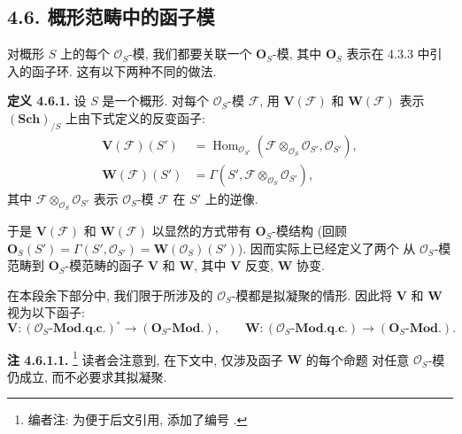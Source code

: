 \subsection*{4.6. 概形范畴中的函子模}

对概形 \(S\) 上的每个 \(\mathcal O_S\)-模, 我们都要关联一个
\(\mathbf O_S\)-模, 其中 \(\mathbf O_S\) 表示在 4.3.3 中引入的函子环.
这有以下两种不同的做法.

\medskip
\noindent{}\textbf{定义 4.6.1.}
设 \(S\) 是一个概形. 对每个 \(\mathcal O_S\)-模 \(\mathscr F\),
用 \(\mathbf V(\mathscr F)\) 和 \(\mathbf W(\mathscr F)\) 表示
\((\mathbf{Sch})_{/S}\) 上由下式定义的反变函子:
\begin{align*}
  \mathbf V(\mathscr F)(S')
    &=\operatorname{Hom}_{\mathcal O_{S'}}
       (\mathscr F\otimes_{\mathcal O_S}\mathcal O_{S'},
        \mathcal O_{S'}),\\
  \mathbf W(\mathscr F)(S')
    &=\Gamma(S',\mathscr F\otimes_{\mathcal O_S}\mathcal O_{S'}),
\end{align*}
其中 \(\mathscr F\otimes_{\mathcal O_S}\mathcal O_{S'}\) 表示
\(\mathcal O_S\)-模 \(\mathscr F\) 在 \(S'\) 上的逆像.

于是 \(\mathbf V(\mathscr F)\) 和 \(\mathbf W(\mathscr F)\)
以显然的方式带有 \(\mathbf O_S\)-模结构 (回顾
\(\mathbf O_S(S')=\Gamma(S',\mathcal O_{S'})
=\mathbf W(\mathcal O_S)(S')\)). 因而实际上已经定义了两个
从 \(\mathcal O_S\)-模范畴到 \(\mathbf O_S\)-模范畴的函子
\(\mathbf V\) 和 \(\mathbf W\), 其中 \(\mathbf V\) 反变,
\(\mathbf W\) 协变.

在本段余下部分中, 我们限于所涉及的 \(\mathcal O_S\)-模都是拟凝聚的情形.
因此将 \(\mathbf V\) 和 \(\mathbf W\) 视为以下函子:
\[
  \mathbf V:(\mathcal O_S\text{-}\mathbf{Mod.q.c.})^{\circ}
    \longrightarrow(\mathbf O_S\text{-}\mathbf{Mod.}),
  \qquad
  \mathbf W:(\mathcal O_S\text{-}\mathbf{Mod.q.c.})
    \longrightarrow(\mathbf O_S\text{-}\mathbf{Mod.}).
\]

\medskip
\noindent{}\textbf{注 4.6.1.1.}
\footnote{编者注: 为便于后文引用, 添加了编号
.}
读者会注意到, 在下文中, 仅涉及函子 \(\mathbf W\) 的每个命题
对任意 \(\mathcal O_S\)-模仍成立, 而不必要求其拟凝聚.

